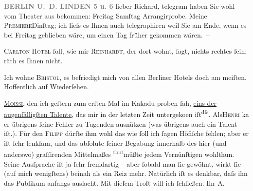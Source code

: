 \pstart
           \raggedleft{}\textcolor{gray}{\textbf{BERLIN U. D. LINDEN 5 u. 6}}\pend
           \vspace{0.5em}
\pstart
           lieber Richard, telegram haben Sie wohl vom Theater aus bekommen:
                  Freitag{ }Samſtag Arrangirprobe. Meine \textsc{Premiere}Dinſtag; ich lieſs es Ihnen auch telegraphiren weil Sie am Ende, wenn es
               bei Freitag geblieben wäre, um einen Tag früher gekommen wären. –\pend
           
\pstart
           \textsc{Carlton Hotel} ſoll, wie mir {\pb}\textsc{Reinhardt}, der dort wohnt, ſagt, nichts rechtes ſein; räth es Ihnen nicht.\pend
           
\pstart
           Ich wohne \textsc{Bristol}, es befriedigt mich von allen Berliner
               Hotels doch am meiſten. Hoffentlich auf Wiederſehen.\pend
           
\pstart
           \textsc{\uline{Moissi}}, den ich geſtern zum erſten Mal im Kakadu
               proben ſah, \uline{eins der augenfälligſten Talente}, das mir
               in der {\pb}letzten Zeit untergeko{\geminationm}en iſt\substVorne{}\textsuperscript{dſs}\substDazwischen{}. Als\substHinten{}{ }\textsc{Henri} ka{\geminationn} er übrigens ſeine Fehler zu Tugenden ausnützen
               (was übrigens auch ein Talent iſt.). Für den \textsc{Filipp} dürfte ihm wohl das wie ſoll ich ſagen Höfiſche fehlen; aber er iſt ſehr
               lenkſam, und das abſolute ſeiner Begabung innerhalb {\pb}des hier (und anderswo) graſſirenden Mittelmaßes \substVorne{}\textsuperscript{\textcolor{gray}{thut}}\substDazwischen{}müßte\substHinten{} jedem Vernünftigen wohlthun. Seine Ausſprache iſt ja ſehr fremdartig – aber
               ſobald man ſie gewöhnt, wirkt ſie (auf mich wenigſtens) beinah als ein Reiz mehr.
               Natürlich iſt es denkbar, daſs ihn das Publikum anfangs auslacht. Mit dieſem Troſt
               will ich ſchließen. \pend
           \pstart Ihr \spacefill\mbox{A.}\pend{}\endnumbering{}  
      